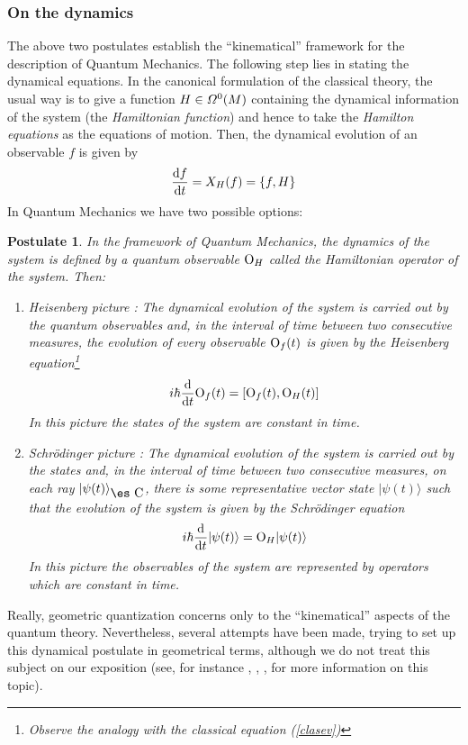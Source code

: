 \documentclass[12pt]{article}
\theoremstyle{plain}
\newtheorem{post}{Postulate}
\def\beq{\begin{equation}}
\def\eeq{\end{equation}}
\def\d{{\rm d}}
\def\Op{{\rm O}}
\def\Complex{\mbox{\es C}}
\begin{document}
\subsubsection{On the dynamics}


The above two postulates establish the ``kinematical'' framework
for the description of Quantum Mechanics.
The following step lies in stating the dynamical equations.
In the canonical formulation of the classical theory,
the usual way is to give a function $H \in {\mit\Omega}^0(M)$
containing the dynamical information of the system
(the {\it Hamiltonian function}) and hence to take the
{\it Hamilton equations} as the equations of motion.
Then, the dynamical evolution of an observable $f$ is given by
\beq
\frac{\d f}{\d t} = X_H(f) = \{ f,H \}
\label{clasev}
\eeq
In Quantum Mechanics we have two possible options:

\begin{post}
In the framework of Quantum Mechanics, the dynamics of the system is
defined
by a quantum observable $\Op_H$ called the
{\it Hamiltonian operator} of the system. Then:
\begin{enumerate}
\item
{\rm Heisenberg picture \/}:
The dynamical evolution of the system is carried out by the quantum
observables and,
in the interval of time between two consecutive measures,
the evolution of every observable $\Op_f(t)$  is given by the
{\rm Heisenberg equation}\footnote{
Observe the analogy with the classical equation
(\ref{clasev})}
$$
i\hbar\frac{\d}{\d t}{\Op_f(t)} = [\Op_f(t),\Op_H(t)]
$$
In this picture the states of the system are constant in time.
\item
{\rm Schr\"odinger picture \/}:
The dynamical evolution of the system is carried out by the states and,
in the interval of time between two consecutive measures, on each ray
$|\psi (t) \rangle_{\Complex}$, there is some representative vector
state
$|\psi (t) \rangle $ such that the evolution of the system is given by
the
{\rm Schr\"{o}dinger equation}
$$
i\hbar\frac{\d}{\d t}|\psi (t) \rangle = \Op_H|\psi (t) \rangle
$$
In this picture the observables of the system are  represented
by operators which are constant in time.
\end{enumerate}
\label{pos5}
\end{post}

Really, geometric quantization concerns only to the ``kinematical''
aspects of the quantum theory. Nevertheless, several
attempts have been made, trying to set up this dynamical postulate in
geometrical terms,
although we do not treat this subject on our exposition
(see, for instance \cite{ACP-82}, \cite{Il-98a}, \cite{Il-98b},
\cite{Tu-85}
for more information on this topic).
\end{document}
